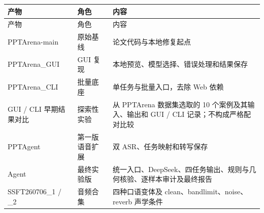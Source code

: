 \documentclass[11pt,a4paper,UTF8,fontset=fandol]{ctexart}
\begin{document}
\begin{longtable}{L{3.2cm} L{3.3cm} L{8.0cm}}
\toprule
产物 & 角色 & 内容 \\
\midrule
\endfirsthead
\toprule
产物 & 角色 & 内容 \\
\midrule
\endhead
PPTArena-main & 原始基线 & 论文代码与本地修复起点 \\
PPTArena\_GUI & GUI 复现 & 本地预览、模型选择、错误处理和结果保存 \\
PPTArena\_CLI & 批量底座 & 单任务与批量入口，去除 Web 依赖 \\
GUI / CLI 早期结果对比 & 探索性实验 & 从 PPTArena 数据集选取的 10 个案例及其输入、输出和 GUI / CLI 记录；不构成严格配对比较 \\
PPTAgent & 第一版语音扩展 & 双 ASR、任务映射和转写保存 \\
Agent & 最终实验版 & 统一入口、DeepSeek、四任务输出、规则与几何核验、逐样本审计及最终报告 \\
SSFT260706\_1 / \_2 & 音频合集 & 四种口语变体及 clean、bandlimit、noise、reverb 声学条件 \\
\bottomrule
\end{longtable}
\end{document}
